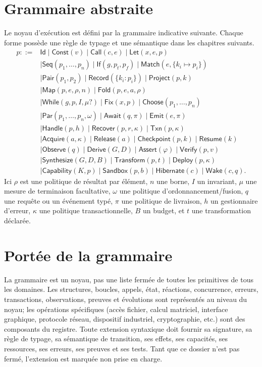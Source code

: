 \documentclass[11pt,a4paper,openany]{book}
\theoremstyle{definition}
\theoremstyle{plain}
\theoremstyle{remark}
\begin{document}
\section{Grammaire abstraite}
Le noyau d'exécution est défini par la grammaire indicative suivante. Chaque forme possède une règle de typage et une sémantique dans les chapitres suivants.
\begin{align*}
p ::= {}& \mathsf{Id}\mid\mathsf{Const}(v)\mid\mathsf{Call}(c,e)\mid\mathsf{Let}(x,e,p)\\
&\mid\mathsf{Seq}(p_1,\ldots,p_n)\mid\mathsf{If}(g,p_t,p_f)\mid\mathsf{Match}(e,\{k_i\mapsto p_i\})\\
&\mid\mathsf{Pair}(p_1,p_2)\mid\mathsf{Record}(\{k_i:p_i\})\mid\mathsf{Project}(p,k)\\
&\mid\mathsf{Map}(p,e,\rho,n)\mid\mathsf{Fold}(p,e,a,\rho)\\
&\mid\mathsf{While}(g,p,I,\mu?)\mid\mathsf{Fix}(x,p)\mid\mathsf{Choose}(p_1,\ldots,p_n)\\
&\mid\mathsf{Par}(p_1,\ldots,p_n,\omega)\mid\mathsf{Await}(q,\pi)\mid\mathsf{Emit}(e,\pi)\\
&\mid\mathsf{Handle}(p,h)\mid\mathsf{Recover}(p,r,\kappa)\mid\mathsf{Txn}(p,\kappa)\\
&\mid\mathsf{Acquire}(a,\kappa)\mid\mathsf{Release}(a)\mid\mathsf{Checkpoint}(p,k)\mid\mathsf{Resume}(k)\\
&\mid\mathsf{Observe}(q)\mid\mathsf{Derive}(G,D)\mid\mathsf{Assert}(\varphi)\mid\mathsf{Verify}(p,v)\\
&\mid\mathsf{Synthesize}(G,D,B)\mid\mathsf{Transform}(p,t)\mid\mathsf{Deploy}(p,\kappa)\\
&\mid\mathsf{Capability}(K,p)\mid\mathsf{Sandbox}(p,b)\mid\mathsf{Hibernate}(c)\mid\mathsf{Wake}(c,q).
\end{align*}
Ici $\rho$ est une politique de résultat par élément, $n$ une borne, $I$ un invariant, $\mu$ une mesure de terminaison facultative, $\omega$ une politique d'ordonnancement/fusion, $q$ une requête ou un événement typé, $\pi$ une politique de livraison, $h$ un gestionnaire d'erreur, $\kappa$ une politique transactionnelle, $B$ un budget, et $t$ une transformation déclarée.

\section{Portée de la grammaire}
La grammaire est un noyau, pas une liste fermée de toutes les primitives de tous les domaines. Les structures, boucles, appels, état, réactions, concurrence, erreurs, transactions, observations, preuves et évolutions sont représentés au niveau du noyau; les opérations spécifiques (accès fichier, calcul matriciel, interface graphique, protocole réseau, dispositif industriel, cryptographie, etc.) sont des composants du registre. Toute extension syntaxique doit fournir sa signature, sa règle de typage, sa sémantique de transition, ses effets, ses capacités, ses ressources, ses erreurs, ses preuves et ses tests. Tant que ce dossier n'est pas fermé, l'extension est marquée non prise en charge.
\end{document}
